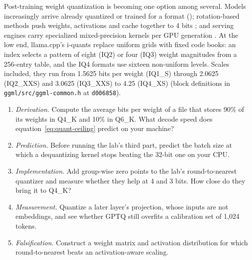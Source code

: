 
Post-training weight quantization is becoming one option among several.
Models increasingly arrive already quantized or trained for a format
(); rotation-based methods push weights,
activations and cache together to 4 bits \cite{ashkboos2024quarot,liu2025spinquant};
and serving engines carry specialized mixed-precision kernels per GPU
generation \cite{frantar2024marlin}. At the low end, llama.cpp's i-quants
replace uniform grids with fixed code books: an index selects a pattern of
eight (IQ2) or four (IQ3) weight magnitudes from a 256-entry table, and the IQ4
formats use sixteen non-uniform levels. Scales included, they run from 1.5625
bits per weight (IQ1\_S) through 2.0625 (IQ2\_XXS) and 3.0625 (IQ3\_XXS) to
4.25 (IQ4\_XS) (block definitions in \texttt{ggml/src/ggml-common.h} at
\texttt{d006858}).

\ExercisesSection

\begin{enumerate}
\item \emph{Derivation.} Compute the average bits per weight of a file that
stores 90\% of its weights in Q4\_K and 10\% in Q6\_K. What decode speed does
equation~\eqref{eq:quant-ceiling} predict on your machine?
\item \emph{Prediction.} Before running the lab's third part, predict the batch
size at which a dequantizing kernel stops beating the 32-bit one on your CPU.
\item \emph{Implementation.} Add group-wise zero points to the lab's
round-to-nearest quantizer and measure whether they help at 4 and 3 bits. How
close do they bring it to Q4\_K?
\item \emph{Measurement.} Quantize a later layer's projection, whose inputs are
not embeddings, and see whether GPTQ still overfits a calibration set of 1,024
tokens.
\item \emph{Falsification.} Construct a weight matrix and activation
distribution for which round-to-nearest beats an activation-aware scaling.
\end{enumerate}


